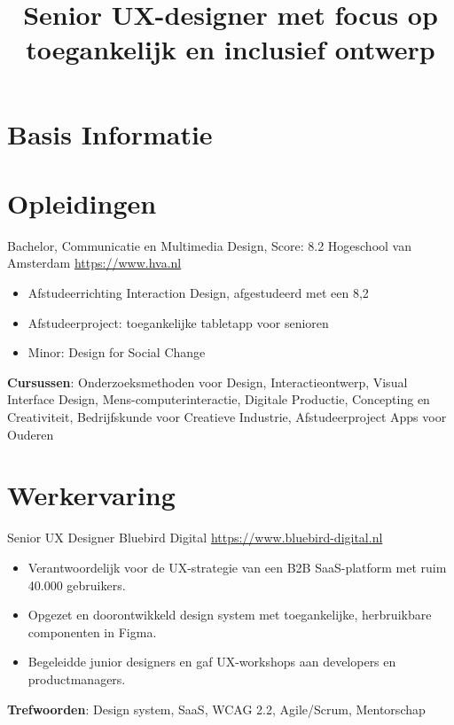 \documentclass[a4paper, serif, 10pt]{moderncv}
\title{Senior UX-designer met focus op toegankelijk en inclusief ontwerp}
\begin{document}
\maketitle

\section{Basis Informatie}

\section{Opleidingen}

        {Bachelor, Communicatie en Multimedia Design, Score: 8.2}
        {Hogeschool van Amsterdam}
        {\url{https://www.hva.nl}}
        {}
        {\begin{itemize}
\item Afstudeerrichting Interaction Design, afgestudeerd met een 8,2
\item Afstudeerproject: toegankelijke tabletapp voor senioren
\item Minor: Design for Social Change
\end{itemize}
\textbf{Cursussen}: Onderzoeksmethoden voor Design, Interactieontwerp, Visual Interface Design, Mens-computerinteractie, Digitale Productie, Concepting en Creativiteit, Bedrijfskunde voor Creatieve Industrie, Afstudeerproject Apps voor Ouderen}
\section{Werkervaring}

        {Senior UX Designer}
        {Bluebird Digital}
        {\url{https://www.bluebird-digital.nl}}
        {}
        {\begin{itemize}
\item Verantwoordelijk voor de UX-strategie van een B2B SaaS-platform met ruim 40.000 gebruikers.
\item Opgezet en doorontwikkeld design system met toegankelijke, herbruikbare componenten in Figma.
\item Begeleidde junior designers en gaf UX-workshops aan developers en productmanagers.
\end{itemize}
\textbf{Trefwoorden}: Design system, SaaS, WCAG 2.2, Agile/Scrum, Mentorschap}
\end{document}
